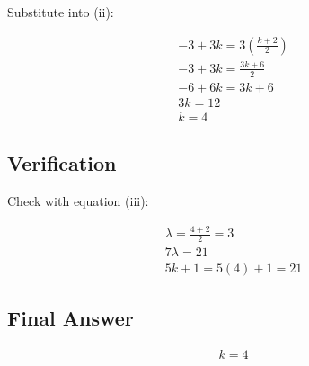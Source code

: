 \documentclass{article}
\begin{document}
Substitute into (ii):

\begin{align}
-3 + 3k = 3 (\frac{k + 2}{2})\\
-3 + 3k = \frac{3k + 6}{2}\\
-6 + 6k = 3k + 6\\
3k = 12\\
k = 4
\end{align}


\subsection*{Verification}
Check with equation (iii):

\begin{align}
\lambda = \frac{4 + 2}{2} = 3 \\
7\lambda = 21 \\
5k + 1 = 5(4) + 1 = 21
\end{align}


\subsection*{Final Answer}

\begin{align}
\boxed{k = 4}
\end{align}
\end{document}

